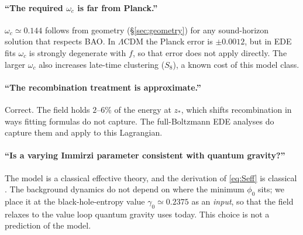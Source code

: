 \documentclass[11pt]{article}
\begin{document}
\paragraph{``The required $\omega_c$ is far from Planck.''} $\omega_c\simeq0.144$ follows
from geometry (\S\ref{sec:geometry}) for any sound-horizon solution that respects BAO.
In $\Lambda$CDM the Planck error is $\pm0.0012$, but in EDE fits $\omega_c$ is strongly
degenerate with $f$, so that error does not apply directly. The larger $\omega_c$ also
increases late-time clustering ($S_8$), a known cost of this model class.

\paragraph{``The recombination treatment is approximate.''} Correct. The field holds
$2$--$6\%$ of the energy at $z_*$, which shifts recombination in ways fitting formulas
do not capture. The full-Boltzmann EDE analyses \cite{poulin2025} do capture them and
apply to this Lagrangian.

\paragraph{``Is a varying Immirzi parameter consistent with quantum gravity?''} The
model is a classical effective theory, and the derivation of \eqref{eq:Seff} is classical
\cite{taveras2008}. The background dynamics do not depend on where the minimum $\phi_0$
sits; we place it at the black-hole-entropy value $\gamma_0\simeq0.2375$
\cite{domagala2004,meissner2004} as an \emph{input}, so that the field relaxes to the value
loop quantum gravity uses today. This choice is not a prediction of the model.

\end{document}
